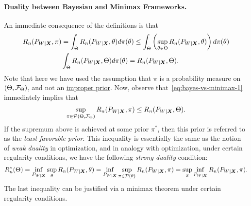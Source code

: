 \documentclass[12pt]{article}
\begin{document}
\paragraph{Duality between Bayesian and Minimax Frameworks.} An immediate consequence of the definitions is that 
\begin{align}
	R_n(P_{W|{\boldsymbol X}}, \pi) &= \int_{\Theta} R_n(P_{W|{\boldsymbol X}}, \theta) d\pi(\theta) \leq \int_{\Theta} \left( \sup_{\theta \in \Theta} R_n(P_{W|{\boldsymbol X}}, \theta)\right) d\pi(\theta) \\ 
	& \int_{\Theta} R_n(P_{W|{\boldsymbol X}}, \Theta) d\pi(\theta) = R_n(P_{W|{\boldsymbol X}}, \Theta). \label{eq:bayes-vs-minimax-1}
\end{align}
Note that here we have used the assumption that $\pi$ is a probability measure on $(\Theta, {\cal F}_\Theta)$, and not an \href{https://en.wikipedia.org/wiki/Prior_probability#Improper_priors}{improper prior}. Now, observe that~\eqref{eq:bayes-vs-minimax-1} immediately implies that 
\begin{align}
	\sup_{\pi \in \mathcal{P}(\Theta, {\cal F}_\Theta)} R_n(P_{W|{\boldsymbol X}}, \pi) \leq R_n(P_{W|{\boldsymbol X}}, \Theta). \label{eq:bayes-vs-minimax-2} 
\end{align}
If the supremum above is achieved at some prior $\pi^*$, then this prior is referred to as the \emph{least favorable prior}. 
This inequality is essentially the same as the notion of \emph{weak duality} in optimization, and in analogy with optimization, under certain regularity conditions, we have the following \emph{strong duality} condition: 
\begin{align}
	R_n^*(\Theta) = \inf_{P_{W|{\boldsymbol X}}} \sup_{\theta} R_n(P_{W|{\boldsymbol X}}, \theta) =  \inf_{P_{W|{\boldsymbol X}}} \sup_{\pi \in {\cal P}(\theta)} R_n(P_{W|{\boldsymbol X}}, \pi)  = \sup_{\pi} \inf_{P_{W|{\boldsymbol X}}} R_n(P_{W|{\boldsymbol X}}, \pi). 
\end{align}
The last inequality can be justified via a minimax theorem under certain regularity conditions. 


\end{document}
